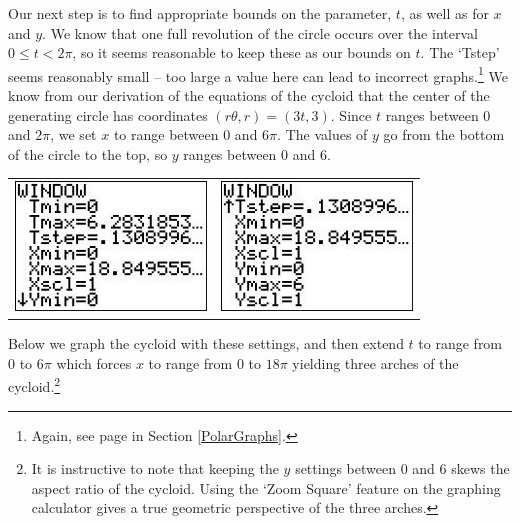 Our next step is to find appropriate bounds on the parameter, $t$, as well as for $x$ and $y$.   We know that one full revolution of the circle occurs over the interval $0 \leq t < 2\pi$, so it seems reasonable to keep these as our bounds on $t$.  The `Tstep' seems reasonably small -- too large a value here can lead to incorrect graphs.\footnote{Again, see page \pageref{polargraphscalculator} in Section \ref{PolarGraphs}.}  We know from our derivation of the equations of the cycloid that the center of the generating circle has coordinates $(r\theta,r)  = (3t,3)$.  Since  $t$ ranges between $0$ and $2\pi$, we set $x$ to range between $0$ and $6\pi$.  The values of $y$ go from the bottom of the circle to the top, so $y$ ranges between $0$ and $6$.

\begin{center}
\begin{tabular}{cc}

\includegraphics[width=2in]{./ParametricEquationsGraphics/Parametric03.jpg} &
\hspace{0.75in} \includegraphics[width=2in]{./ParametricEquationsGraphics/Parametric04.jpg} \\

\end{tabular} 


\end{center}

Below we graph the cycloid with these settings, and then extend $t$ to range from $0$ to $6\pi$ which forces $x$ to range from $0$ to $18\pi$ yielding three arches of the cycloid.\footnote{It is instructive to note that keeping the $y$ settings between 0 and 6 skews the aspect ratio of the cycloid.  Using the `Zoom Square' feature on the graphing calculator gives a true geometric perspective of the three arches.}

